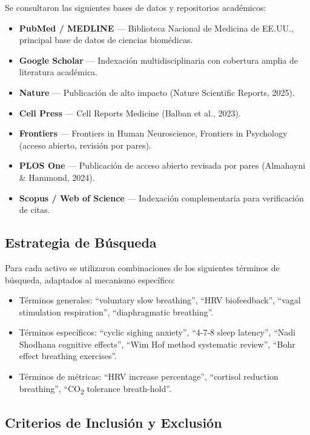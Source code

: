 \documentclass[12pt,a4paper]{article}
\begin{document}
Se consultaron las siguientes bases de datos y repositorios académicos:

\begin{itemize}[itemsep=2pt]
    \item \textbf{PubMed / MEDLINE} — Biblioteca Nacional de Medicina de EE.UU.,
          principal base de datos de ciencias biomédicas.
    \item \textbf{Google Scholar} — Indexación multidisciplinaria con cobertura
          amplia de literatura académica.
    \item \textbf{Nature} — Publicación de alto impacto (Nature Scientific Reports, 2025).
    \item \textbf{Cell Press} — Cell Reports Medicine (Balban et al., 2023).
    \item \textbf{Frontiers} — Frontiers in Human Neuroscience, Frontiers in
          Psychology (acceso abierto, revisión por pares).
    \item \textbf{PLOS One} — Publicación de acceso abierto revisada por pares
          (Almahayni \& Hammond, 2024).
    \item \textbf{Scopus / Web of Science} — Indexación complementaria para
          verificación de citas.
\end{itemize}

\subsection{Estrategia de Búsqueda}

Para cada activo se utilizaron combinaciones de los siguientes términos de
búsqueda, adaptados al mecanismo específico:

\begin{itemize}[itemsep=2pt]
    \item Términos generales: ``voluntary slow breathing'', ``HRV biofeedback'',
          ``vagal stimulation respiration'', ``diaphragmatic breathing''.
    \item Términos específicos: ``cyclic sighing anxiety'', ``4-7-8 sleep
          latency'', ``Nadi Shodhana cognitive effects'', ``Wim Hof method
          systematic review'', ``Bohr effect breathing exercises''.
    \item Términos de métricas: ``HRV increase percentage'', ``cortisol
          reduction breathing'', ``CO\textsubscript{2} tolerance breath-hold''.
\end{itemize}

\subsection{Criterios de Inclusión y Exclusión}
\end{document}
